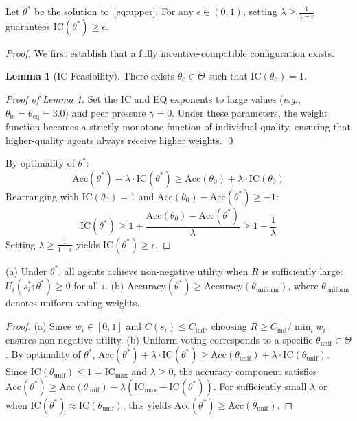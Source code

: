 \documentclass[runningheads]{llncs}
\newcommand{\eg}{\textit{e.g.}}
\begin{document}
\begin{theorem}
\label{thm:ic}
Let $\theta^*$ be the solution to~\eqref{eq:upper}. For any $\epsilon \in (0,1)$, setting $\lambda \geq \frac{1}{1-\epsilon}$ guarantees $\text{IC}(\theta^*) \geq \epsilon$.
\end{theorem}

\begin{proof}
We first establish that a fully incentive-compatible configuration exists.

\textbf{Lemma 1} (IC Feasibility). There exists $\theta_0 \in \Theta$ such that $\text{IC}(\theta_0) = 1$.

\emph{Proof of Lemma 1.} Set the IC and EQ exponents to large values (\eg, $\theta_{\text{ic}} = \theta_{\text{eq}} = 3.0$) and peer pressure $\gamma = 0$. Under these parameters, the weight function becomes a strictly monotone function of individual quality, ensuring that higher-quality agents always receive higher weights. \qed

By optimality of $\theta^*$:
\begin{equation}
    \text{Acc}(\theta^*) + \lambda \cdot \text{IC}(\theta^*) \geq \text{Acc}(\theta_0) + \lambda \cdot \text{IC}(\theta_0)
\end{equation}
Rearranging with $\text{IC}(\theta_0) = 1$ and $\text{Acc}(\theta_0) - \text{Acc}(\theta^*) \geq -1$:
\begin{equation}
    \text{IC}(\theta^*) \geq 1 + \frac{\text{Acc}(\theta_0) - \text{Acc}(\theta^*)}{\lambda} \geq 1 - \frac{1}{\lambda}
\end{equation}
Setting $\lambda \geq \frac{1}{1-\epsilon}$ yields $\text{IC}(\theta^*) \geq \epsilon$.
\end{proof}

\begin{theorem}
\label{thm:ir}
(a) Under $\theta^*$, all agents achieve non-negative utility when $R$ is sufficiently large: $U_i(s_i^*; \theta^*) \geq 0$ for all $i$.
(b) $\text{Accuracy}(\theta^*) \geq \text{Accuracy}(\theta_{\text{uniform}})$, where $\theta_{\text{uniform}}$ denotes uniform voting weights.
\end{theorem}

\begin{proof}
(a) Since $w_i \in [0,1]$ and $C(s_i) \leq C_{\text{ind}}$, choosing $R \geq C_{\text{ind}} / \min_i w_i$ ensures non-negative utility. (b) Uniform voting corresponds to a specific $\theta_{\text{unif}} \in \Theta$. By optimality of $\theta^*$, $\text{Acc}(\theta^*) + \lambda \cdot \text{IC}(\theta^*) \geq \text{Acc}(\theta_{\text{unif}}) + \lambda \cdot \text{IC}(\theta_{\text{unif}})$. Since $\text{IC}(\theta_{\text{unif}}) \leq 1 = \text{IC}_{\max}$ and $\lambda \geq 0$, the accuracy component satisfies $\text{Acc}(\theta^*) \geq \text{Acc}(\theta_{\text{unif}}) - \lambda(\text{IC}_{\max} - \text{IC}(\theta^*))$. For sufficiently small $\lambda$ or when $\text{IC}(\theta^*) \approx \text{IC}(\theta_{\text{unif}})$, this yields $\text{Acc}(\theta^*) \geq \text{Acc}(\theta_{\text{unif}})$.
\end{proof}
\end{document}
